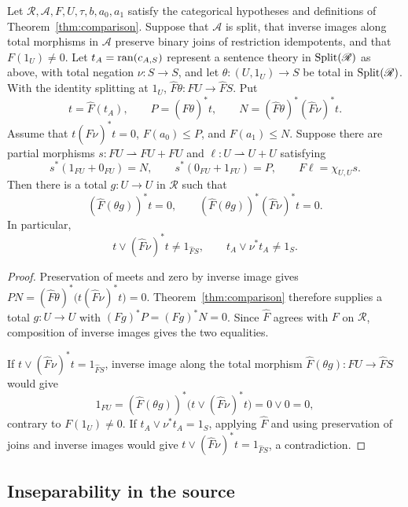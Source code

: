 \begin{theorem}\label{thm:logical-comparison}
Let $\mathscr R,\mathcal A,F,U,\tau,b,a_0,a_1$ satisfy the
categorical hypotheses and definitions of
Theorem~\ref{thm:comparison}. Suppose that $\mathcal A$ is split,
that inverse images along total morphisms in $\mathcal A$ preserve binary joins
of restriction idempotents, and that $F(1_U)\ne0$.
Let $t_A=\operatorname{ran}(c_{A,S})$ represent a sentence theory in
$\operatorname{Split}(\mathscr R)$ as above, with total negation
$\nu:S\to S$, and let $\theta:(U,1_U)\to S$ be total in
$\operatorname{Split}(\mathscr R)$. With the identity splitting at $1_U$,
$\widehat F\theta:FU\to\widehat F S$. Put
\[
 t=\widehat F(t_A),\qquad
 P=(\widehat F\theta)^*t,\qquad
 N=(\widehat F\theta)^*(\widehat F\nu)^*t.
\]
Assume that $t(\widehat F\nu)^*t=0$, $F(a_0)\le P$, and
$F(a_1)\le N$.
Suppose there are partial morphisms
$s:FU\rightharpoonup FU+FU$ and
$\ell:U\rightharpoonup U+U$ satisfying
\[
 s^*(1_{FU}+0_{FU})=N,\qquad
 s^*(0_{FU}+1_{FU})=P,\qquad
 F\ell=\chi_{U,U}s.
\]
Then there is a total $g:U\to U$ in $\mathscr R$ such that
\[
 (\widehat F(\theta g))^*t=0,\qquad
 (\widehat F(\theta g))^*(\widehat F\nu)^*t=0.
\]
In particular,
\[
 t\vee(\widehat F\nu)^*t\ne1_{\widehat F S},\qquad
 t_A\vee\nu^*t_A\ne1_S.
\]
\end{theorem}
\begin{proof}
Preservation of meets and zero by inverse image gives
$PN=(\widehat F\theta)^*\bigl(t(\widehat F\nu)^*t\bigr)=0$.
Theorem~\ref{thm:comparison} therefore supplies a total $g:U\to U$
with $(Fg)^*P=(Fg)^*N=0$. Since $\widehat F$ agrees with $F$ on
$\mathscr R$, composition of inverse images gives the two equalities.

If $t\vee(\widehat F\nu)^*t=1_{\widehat F S}$, inverse image along
the total morphism $\widehat F(\theta g):FU\to\widehat F S$ would
give
\[
 1_{FU}
 =(\widehat F(\theta g))^*\bigl(t\vee(\widehat F\nu)^*t\bigr)
 =0\vee0=0,
\]
contrary to $F(1_U)\ne0$.
If $t_A\vee\nu^*t_A=1_S$, applying $\widehat F$ and using
preservation of joins and inverse images would give
$t\vee(\widehat F\nu)^*t=1_{\widehat F S}$, a contradiction.
\end{proof}

\subsection{Inseparability in the source}

